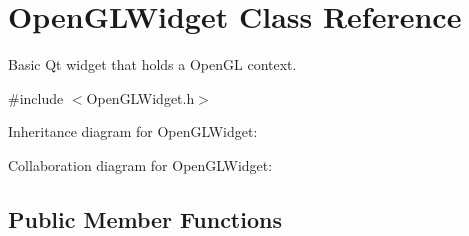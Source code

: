 \hypertarget{class_open_g_l_widget}{\section{Open\-G\-L\-Widget Class Reference}
\label{class_open_g_l_widget}
}


Basic Qt widget that holds a Open\-G\-L context.  




{\ttfamily \#include $<$Open\-G\-L\-Widget.\-h$>$}



Inheritance diagram for Open\-G\-L\-Widget\-:


Collaboration diagram for Open\-G\-L\-Widget\-:
\subsection*{Public Member Functions}

